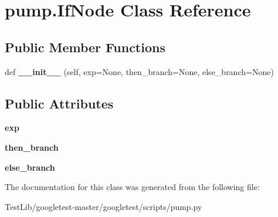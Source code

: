 \hypertarget{classpump_1_1IfNode}{}\section{pump.\+If\+Node Class Reference}
\label{classpump_1_1IfNode}
\subsection*{Public Member Functions}
\begin{DoxyCompactItemize}
\item 
\mbox{\label{classpump_1_1IfNode_ab8bff21c18d60b461f7b6fa9dfa59f7c}} 
def {\bfseries \+\_\+\+\_\+init\+\_\+\+\_\+} (self, exp=None, then\+\_\+branch=None, else\+\_\+branch=None)
\end{DoxyCompactItemize}
\subsection*{Public Attributes}
\begin{DoxyCompactItemize}
\item 
\mbox{\label{classpump_1_1IfNode_a92042e4262196ffd7366350539f512d8}} 
{\bfseries exp}
\item 
\mbox{\label{classpump_1_1IfNode_aa9e2e488564629f8dc0d64d165a19ffa}} 
{\bfseries then\+\_\+branch}
\item 
\mbox{\label{classpump_1_1IfNode_a12e422b16ed4291f15cd95cd6e7f81eb}} 
{\bfseries else\+\_\+branch}
\end{DoxyCompactItemize}


The documentation for this class was generated from the following file\+:\begin{DoxyCompactItemize}
\item 
Test\+Lib/googletest-\/master/googletest/scripts/pump.\+py\end{DoxyCompactItemize}

